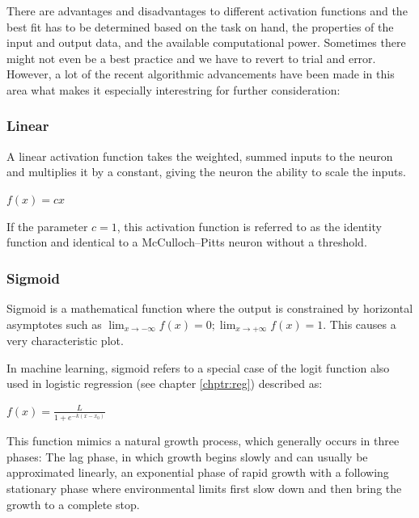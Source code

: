 There are advantages and disadvantages to different activation functions and the best fit has to be determined based on the task on hand, the properties of the input and output data, and the available computational power. Sometimes there might not even be a best practice and we have to revert to trial and error.
However, a lot of the recent algorithmic advancements have been made in this area what makes it especially interestring for further consideration:


\subsubsection{Linear}

A linear activation function takes the weighted, summed inputs to the neuron and multiplies it by a constant, giving the neuron the ability to scale the inputs.

{\centering
  $f(x)=cx$\par
}

If the parameter $c = 1$, this activation function is referred to as the identity function and identical to a McCulloch–Pitts neuron without a threshold.


\subsubsection{Sigmoid}

Sigmoid is a mathematical function where the output is constrained by horizontal asymptotes such as $\displaystyle \lim_{x\to - \infty} f(x) =  0; \lim_{x\to + \infty} f(x) =  1$. This causes a very characteristic plot. 

In machine learning, sigmoid refers to a special case of the logit function also used in logistic regression (see chapter \ref{chptr:reg}) described as:

\vspace{15pt}

{\centering
	$\displaystyle f(x)={\frac {L}{1+e^{-k(x-x_{0})}}}$\par
}

\vspace{15pt}


This function mimics a natural growth process, which generally occurs in three phases: The lag phase, in which growth begins slowly and can usually be approximated linearly, an exponential phase of rapid growth with a following stationary phase where environmental limits first slow  down and then bring the growth to a complete stop.

